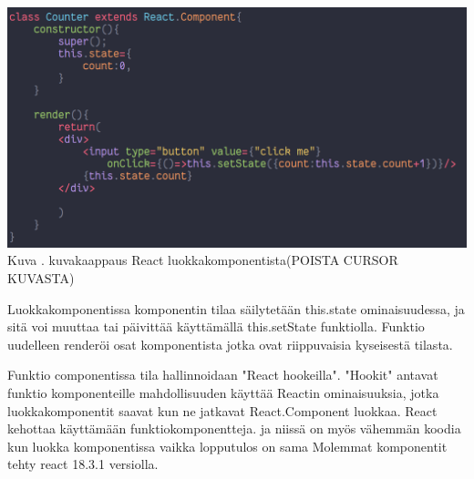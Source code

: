 \includegraphics[width=15cm]{src/public/oppar/class_.png}\\
Kuva \getImgCount{}. kuvakaappaus React luokkakomponentista(POISTA CURSOR KUVASTA)
\medskip



Luokkakomponentissa komponentin tilaa säilytetään this.state ominaisuudessa, ja sitä voi muuttaa tai päivittää käyttämällä this.setState funktiolla. 
Funktio uudelleen renderöi osat komponentista jotka ovat riippuvaisia kyseisestä tilasta.
\medskip


Funktio componentissa tila hallinnoidaan "React hookeilla"{}. 
"Hookit"{} antavat funktio komponenteille mahdollisuuden käyttää Reactin ominaisuuksia, 
jotka luokkakomponentit saavat kun ne jatkavat React.Component luokkaa.
%
React kehottaa käyttämään funktiokomponentteja. 
ja niissä on myös vähemmän koodia kun luokka komponentissa vaikka lopputulos on sama
Molemmat komponentit tehty react 18.3.1 versiolla.







\medskip

